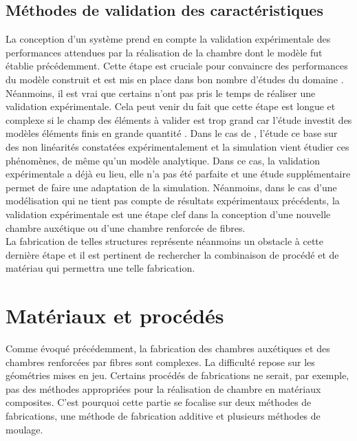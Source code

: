 \documentclass[10pt, a4paper]{article}
\begin{document}
    \subsection{Méthodes de validation des caractéristiques}
        
        La conception d'un système prend en compte la validation expérimentale des performances attendues par la réalisation de la chambre dont le modèle fut établie précédemment. Cette étape est cruciale pour convaincre des performances du modèle construit et est mis en place dans bon nombre d'études du domaine \cite{Sedal2018} \cite{Sedal2018a} \cite{Polygerinos2015} \cite{Connolly2017} \cite{Naboni2015} \cite{Doumit2009}. \\
        
        Néanmoins, il est vrai que certains n'ont pas pris le temps de réaliser une validation expérimentale. Cela peut venir du fait que cette étape est longue et complexe si le champ des éléments à valider est trop grand car l'étude investit des modèles éléments finis en grande quantité \cite{AlvarezElipe2012}. Dans le cas de \cite{Karnessis2013}, l'étude ce base sur des non linéarités constatées expérimentalement et la simulation vient étudier ces phénomènes, de même qu'un modèle analytique. Dans ce cas, la validation expérimentale a déjà eu lieu, elle n'a pas été parfaite et une étude supplémentaire permet de faire une adaptation de la simulation. Néanmoins, dans le cas d'une modélisation qui ne tient pas compte de résultats expérimentaux précédents, la validation expérimentale est une étape clef dans la conception d'une nouvelle chambre auxétique ou d'une chambre renforcée de fibres. \\
        
        La fabrication de telles structures représente néanmoins un obstacle à cette dernière étape et il est pertinent de rechercher la combinaison de procédé et de matériau qui permettra une telle fabrication.
        
\section{Matériaux et procédés} 

    Comme évoqué précédemment, la fabrication des chambres auxétiques et des chambres renforcées par fibres sont complexes. La difficulté repose sur les géométries mises en jeu. Certains procédés de fabrications ne serait, par exemple, pas des méthodes appropriées pour la réalisation de chambre en matériaux composites. C'est pourquoi cette partie se focalise sur deux méthodes de fabrications, une méthode de fabrication additive et plusieurs méthodes de moulage.
    
\end{document}
